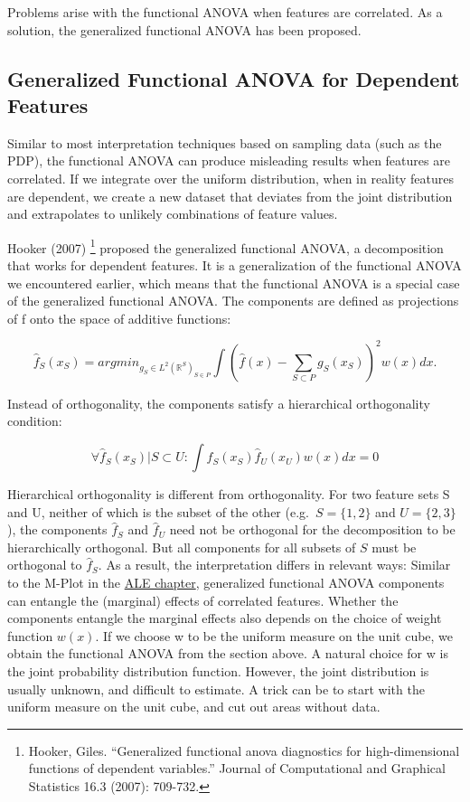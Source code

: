 \documentclass[
  11pt,
]{scrbook}
\begin{document}
Problems arise with the functional ANOVA when features are correlated.
As a solution, the generalized functional ANOVA has been proposed.

\hypertarget{generalized-functional-anova-for-dependent-features}{%
\subsection{Generalized Functional ANOVA for Dependent Features}\label{generalized-functional-anova-for-dependent-features}}

Similar to most interpretation techniques based on sampling data (such as the PDP), the functional ANOVA can produce misleading results when features are correlated.
If we integrate over the uniform distribution, when in reality features are dependent, we create a new dataset that deviates from the joint distribution and extrapolates to unlikely combinations of feature values.

Hooker (2007) \footnote{Hooker, Giles. ``Generalized functional anova diagnostics for high-dimensional functions of dependent variables.'' Journal of Computational and Graphical Statistics 16.3 (2007): 709-732.} proposed the generalized functional ANOVA, a decomposition that works for dependent features.
It is a generalization of the functional ANOVA we encountered earlier, which means that the functional ANOVA is a special case of the generalized functional ANOVA.
The components are defined as projections of f onto the space of additive functions:

\[\hat{f}_S(x_S) = argmin_{g_S \in L^2(\mathbb{R}^S)_{S \in P}} \int \left(\hat{f}(x)  - \sum_{S \subset P} g_S(x_S)\right)^2 w(x)dx.\]

Instead of orthogonality, the components satisfy a hierarchical orthogonality condition:

\[\forall \hat{f}_S(x_S)| S \subset U: \int \hat{f}_S(x_S) \hat{f}_U(x_U) w(x)dx = 0\]

Hierarchical orthogonality is different from orthogonality.
For two feature sets S and U, neither of which is the subset of the other (e.g.~\(S=\{1,2\}\) and \(U=\{2,3\}\)), the components \(\hat{f}_S\) and \(\hat{f}_U\) need not be orthogonal for the decomposition to be hierarchically orthogonal.
But all components for all subsets of \(S\) must be orthogonal to \(\hat{f}_S\).
As a result, the interpretation differs in relevant ways:
Similar to the M-Plot in the \protect\hyperlink{ale}{ALE chapter}, generalized functional ANOVA components can entangle the (marginal) effects of correlated features.
Whether the components entangle the marginal effects also depends on the choice of weight function \(w(x)\).
If we choose w to be the uniform measure on the unit cube, we obtain the functional ANOVA from the section above.
A natural choice for w is the joint probability distribution function.
However, the joint distribution is usually unknown, and difficult to estimate.
A trick can be to start with the uniform measure on the unit cube, and cut out areas without data.
\end{document}
